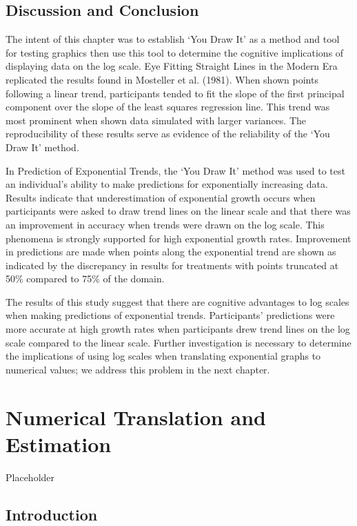 \documentclass[print]{nuthesis}
\begin{document}
\hypertarget{discussion-and-conclusion-1}{%
\section{Discussion and Conclusion}\label{discussion-and-conclusion-1}}

The intent of this chapter was to establish `You Draw It' as a method and tool for testing graphics then use this tool to determine the cognitive implications of displaying data on the log scale.
Eye Fitting Straight Lines in the Modern Era replicated the results found in Mosteller et al. (1981).
When shown points following a linear trend, participants tended to fit the slope of the first principal component over the slope of the least squares regression line.
This trend was most prominent when shown data simulated with larger variances.
The reproducibility of these results serve as evidence of the reliability of the `You Draw It' method.

In Prediction of Exponential Trends, the `You Draw It' method was used to test an individual's ability to make predictions for exponentially increasing data.
Results indicate that underestimation of exponential growth occurs when participants were asked to draw trend lines on the linear scale and that there was an improvement in accuracy when trends were drawn on the log scale.
This phenomena is strongly supported for high exponential growth rates.
Improvement in predictions are made when points along the exponential trend are shown as indicated by the discrepancy in results for treatments with points truncated at 50\% compared to 75\% of the domain.

The results of this study suggest that there are cognitive advantages to log scales when making predictions of exponential trends.
Participants' predictions were more accurate at high growth rates when participants drew trend lines on the log scale compared to the linear scale.
Further investigation is necessary to determine the implications of using log scales when translating exponential graphs to numerical values; we address this problem in the next chapter.

\hypertarget{estimation}{%
\chapter{Numerical Translation and Estimation}\label{estimation}}

Placeholder

\hypertarget{introduction-2}{%
\section{Introduction}\label{introduction-2}}
\end{document}
